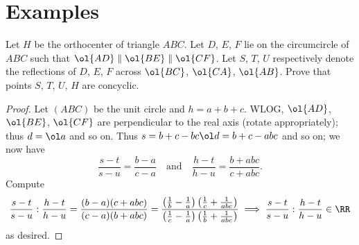 \documentclass[11pt]{scrartcl}
\begin{document}
\section{Examples}
\begin{example}
  [MOP 2006]
  Let $H$ be the orthocenter of triangle $ABC$.
  Let $D$, $E$, $F$ lie on the circumcircle of $ABC$ such that $\ol{AD} \parallel \ol{BE} \parallel \ol{CF}$.
  Let $S$, $T$, $U$ respectively denote the reflections of $D$, $E$, $F$ across $\ol{BC}$, $\ol{CA}$, $\ol{AB}$.
  Prove that points $S$, $T$, $U$, $H$ are concyclic.
\end{example}
\begin{proof}
  Let $(ABC)$ be the unit circle and $h = a+b+c$.
  WLOG, $\ol{AD}$, $\ol{BE}$,  $\ol{CF}$ are perpendicular to the real axis (rotate appropriately); thus $d = \ol a$ and so on.
  Thus $s = b+c - bc \ol d = b+c-abc$ and so on; we now have
  \[ \frac{s-t}{s-u}=\frac{b-a}{c-a}\quad\text{and}\quad\frac{h-t}{h-u}=\frac{b+abc}{c+abc}. \]
  Compute \[ \frac{s-t}{s-u} : \frac{h-t}{h-u} = \frac{(b-a)(c+abc)}{(c-a)(b+abc)}
    = \frac{\left(\frac{1}{b}-\frac{1}{a}\right)\left(\frac{1}{c}+\frac{1}{abc}\right)}{\left(\frac{1}{c}-\frac{1}{a}\right)\left(\frac{1}{b}+\frac{1}{abc}\right)}
    \implies \frac{s-t}{s-u}:\frac{h-t}{h-u} \in \RR \]
  as desired.
\end{proof}
\end{document}
